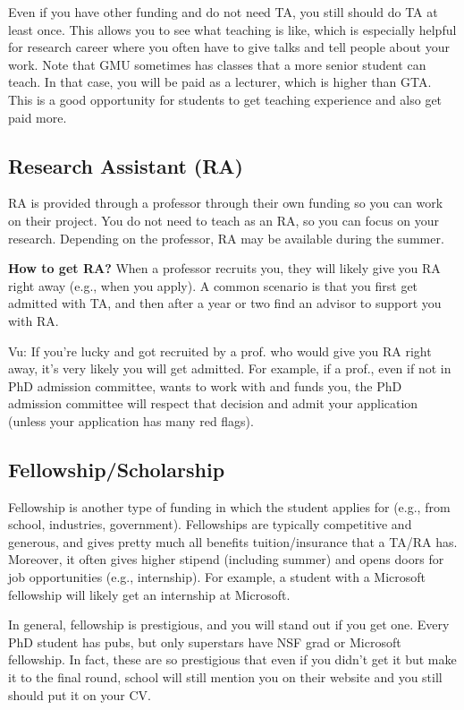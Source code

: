\documentclass[11pt]{article}
\begin{document}
Even if you have other funding and do not need TA, you still should do TA at least once.  This allows you to see what teaching is like, which is especially helpful for research career where you often have to give talks and tell people about your work. Note that GMU sometimes has classes that a more senior student can teach.  In that case, you will be paid as a lecturer, which is higher than GTA.  This is a good opportunity for students to get teaching experience and also get paid more.
\subsection{Research Assistant (RA)}
RA is provided through a professor through their own funding so you can work on their project.  
You do not need to teach as an RA, so you can focus on your research. Depending on the professor, RA may be available during the summer.

\textbf{How to get RA?} When a professor recruits you, they will likely give you RA right away (e.g., when you apply).  A common scenario is that you first get admitted with TA, and then after a year or two find an advisor to support you with RA. 


\begin{tcolorbox}[left=1pt,right=1pt,top=1pt,bottom=1pt]
Vu: If you're lucky and got recruited by a prof. who would give you RA right away, it's very likely you will get admitted.  For example, if a prof., even if not in PhD admission committee, wants to work with and funds you, the PhD admission committee will respect that decision and admit your application (unless your application has many red flags).
\end{tcolorbox}

\subsection{Fellowship/Scholarship}

Fellowship is another type of funding in which the student applies for (e.g., from school, industries, government). Fellowships are typically competitive and generous, and gives pretty much all benefits tuition/insurance that a TA/RA has.  Moreover, it often gives higher stipend (including summer) and opens doors for job opportunities (e.g., internship).  For example, a student with a Microsoft fellowship will likely get an internship at Microsoft.  

In general, fellowship is prestigious, and you will stand out if you get one.  Every PhD student has pubs, but only superstars have NSF grad or Microsoft fellowship. In fact, these are so prestigious that even if you didn't get it but make it to the final round, school will still mention you on their website and you still should put it on your CV.
\end{document}
